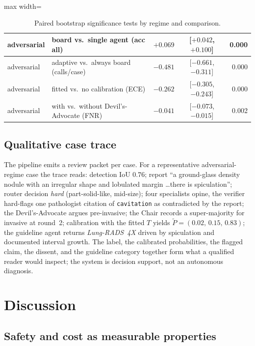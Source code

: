 \documentclass[12pt]{article}
\begin{document}
\begin{table}[htbp]
\begin{adjustbox}{max width=\linewidth}
\begin{tabular}{|l|l|c|c|r|}
\hline
adversarial & board vs.\ single agent (acc all) & $+0.069$ & [$+0.042$, $+0.100$] & 0.000 \\
\hline
adversarial & adaptive vs.\ always board (calls/case) & $-0.481$ & [$-0.661$, $-0.311$] & 0.000 \\
\hline
adversarial & fitted vs.\ no calibration (ECE) & $-0.262$ & [$-0.305$, $-0.243$] & 0.000 \\
\hline
adversarial & with vs.\ without Devil's-Advocate (FNR) & $-0.041$ & [$-0.073$, $-0.015$] & 0.002 \\
\hline
\end{tabular}
\end{adjustbox}
\caption{Paired bootstrap significance tests by regime and comparison.}
\label{tab:sig}
\end{table}

\subsection{Qualitative case trace}

The pipeline emits a review packet per case. For a representative adversarial-regime case the trace reads: detection IoU $0.76$; report \enquote{a ground-glass density nodule with an irregular shape and lobulated margin \ldots there is spiculation}; router decision \emph{hard} (part-solid-like, mid-size); four specialists opine, the verifier hard-flags one pathologist citation of \texttt{cavitation} as contradicted by the report; the Devil's-Advocate argues pre-invasive; the Chair records a super-majority for invasive at round~2; calibration with the fitted $T$ yields $\tilde P = (0.02,\,0.15,\,0.83)$; the guideline agent returns \emph{Lung-RADS~4X} driven by spiculation and documented interval growth. The label, the calibrated probabilities, the flagged claim, the dissent, and the guideline category together form what a qualified reader would inspect; the system is decision support, not an autonomous diagnosis.

\section{Discussion}\label{sec:disc}
\subsection{Safety and cost as measurable properties}
\end{document}
